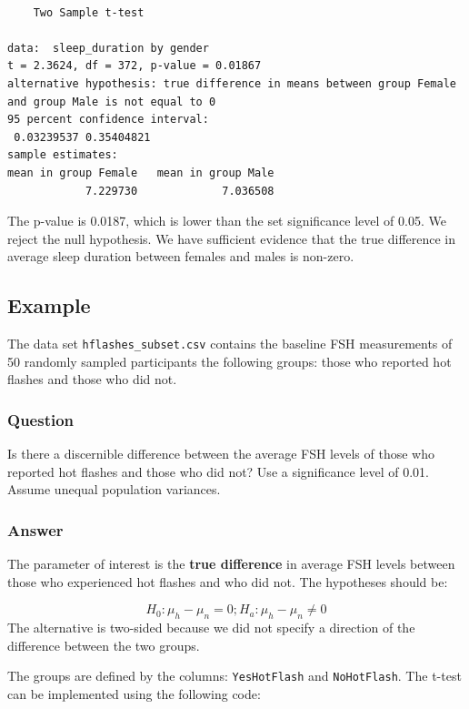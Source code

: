 \documentclass[
  letterpaper,
  DIV=11,
  numbers=noendperiod]{scrartcl}
\begin{document}
\begin{verbatim}

    Two Sample t-test

data:  sleep_duration by gender
t = 2.3624, df = 372, p-value = 0.01867
alternative hypothesis: true difference in means between group Female and group Male is not equal to 0
95 percent confidence interval:
 0.03239537 0.35404821
sample estimates:
mean in group Female   mean in group Male 
            7.229730             7.036508 
\end{verbatim}

The p-value is 0.0187, which is lower than the set significance level of
0.05. We reject the null hypothesis. We have sufficient evidence that
the true difference in average sleep duration between females and males
is non-zero.

\subsection{Example}\label{example-5}

The data set \texttt{hflashes\_subset.csv} contains the baseline FSH
measurements of 50 randomly sampled participants the following groups:
those who reported hot flashes and those who did not.

\subsubsection{Question}

Is there a discernible difference between the average FSH levels of
those who reported hot flashes and those who did not? Use a significance
level of 0.01. Assume unequal population variances.

\subsubsection{Answer}

The parameter of interest is the \textbf{true difference} in average FSH
levels between those who experienced hot flashes and who did not. The
hypotheses should be:

\[
H_0: \mu_h - \mu_n = 0; H_a: \mu_h - \mu_n \neq 0
\] The alternative is two-sided because we did not specify a direction
of the difference between the two groups.

The groups are defined by the columns: \texttt{YesHotFlash} and
\texttt{NoHotFlash}. The t-test can be implemented using the following
code:
\end{document}
